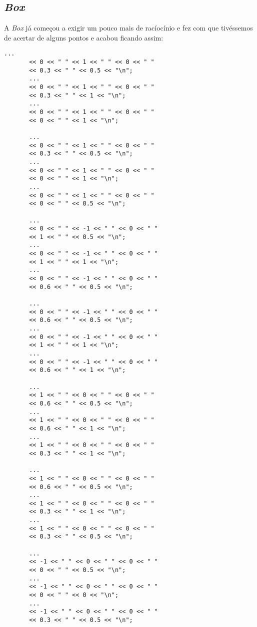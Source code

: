 \documentclass[11pt,a4paper]{report}
\begin{document}
\newpage
\subsection{\emph{Box}}

A \emph{Box} já começou a exigir um pouco mais de racíocínio e fez com que tivéssemos de acertar de alguns pontos e acabou ficando assim:

\begin{multicols}{3}
\begin{lstlisting}[style = code]
       ...
       << 0 << " " << 1 << " " << 0 << " "
       << 0.3 << " " << 0.5 << "\n";
       ...
       << 0 << " " << 1 << " " << 0 << " "
       << 0.3 << " " << 1 << "\n";
       ...
       << 0 << " " << 1 << " " << 0 << " "
       << 0 << " " << 1 << "\n";

       ...
       << 0 << " " << 1 << " " << 0 << " "
       << 0.3 << " " << 0.5 << "\n";
       ...
       << 0 << " " << 1 << " " << 0 << " "
       << 0 << " " << 1 << "\n";
       ...
       << 0 << " " << 1 << " " << 0 << " "
       << 0 << " " << 0.5 << "\n";

       ...
       << 0 << " " << -1 << " " << 0 << " "
       << 1 << " " << 0.5 << "\n";
       ...
       << 0 << " " << -1 << " " << 0 << " "
       << 1 << " " << 1 << "\n";
       ...
       << 0 << " " << -1 << " " << 0 << " "
       << 0.6 << " " << 0.5 << "\n";

       ...
       << 0 << " " << -1 << " " << 0 << " "
       << 0.6 << " " << 0.5 << "\n";
       ...
       << 0 << " " << -1 << " " << 0 << " "
       << 1 << " " << 1 << "\n";
       ...
       << 0 << " " << -1 << " " << 0 << " "
       << 0.6 << " " << 1 << "\n";

       ...
       << 1 << " " << 0 << " " << 0 << " "
       << 0.6 << " " << 0.5 << "\n";
       ...
       << 1 << " " << 0 << " " << 0 << " "
       << 0.6 << " " << 1 << "\n";
       ...
       << 1 << " " << 0 << " " << 0 << " "
       << 0.3 << " " << 1 << "\n";

       ...
       << 1 << " " << 0 << " " << 0 << " "
       << 0.6 << " " << 0.5 << "\n";
       ...
       << 1 << " " << 0 << " " << 0 << " "
       << 0.3 << " " << 1 << "\n";
       ...
       << 1 << " " << 0 << " " << 0 << " "
       << 0.3 << " " << 0.5 << "\n";

       ...
       << -1 << " " << 0 << " " << 0 << " "
       << 0 << " " << 0.5 << "\n";
       ...
       << -1 << " " << 0 << " " << 0 << " "
       << 0 << " " << 0 << "\n";
       ...
       << -1 << " " << 0 << " " << 0 << " "
       << 0.3 << " " << 0.5 << "\n";


\end{lstlisting}
\end{multicols}
\end{document}
